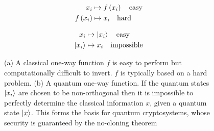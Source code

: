 \begin{figure}[h!]
\centering
\captionsetup{width=\linewidth}
\begin{framed}
\begin{subfigure}{0.49\linewidth}
\begin{align*}
x_i &\mapsto f\left(x_i\right) \qq{easy} \\
f\left(x_i\right) &\mapsto x_i \qq{hard}
\end{align*}
\caption{}
\end{subfigure}
\begin{subfigure}{0.49\linewidth}
\begin{align*}
x_i &\mapsto \ket{x_i} \qq{easy}\\
\ket{x_i} &\mapsto x_i \qq{impossible}
\end{align*}
\caption{}
\end{subfigure}
\caption{(a) A classical one-way function $f$ is easy to perform but computationally difficult to invert. $f$ is typically based on a hard problem. (b) A quantum one-way function. If the quantum states $\ket{x_i}$ are chosen to be non-orthogonal then it is impossible to perfectly determine the classical information $x$, given a quantum state $\ket{x}$. This forms the basis for quantum cryptosystems, whose security is guaranteed by the no-cloning theorem \cite{Nielsen2010, brendon_book}}
\label{fig:qutrapdoor}
\end{framed}
\end{figure}








